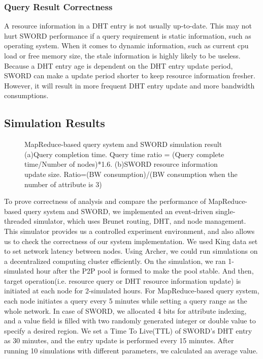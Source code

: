 \documentclass{acm_proc_article-sp}
\begin{document}
\subsubsection{Query Result Correctness}
A resource information in a DHT entry is not usually up-to-date. This may not hurt SWORD performance if a query requirement is static information, such as operating system. 
When it comes to dynamic information, such as current cpu load or free memory size, the stale information is highly likely to be useless. 
Because a DHT entry age is dependent on the DHT entry update period, SWORD can make a update period shorter to keep resource information fresher.
However, it will result in more frequent DHT entry update and more bandwidth consumptions.
\subsection{Simulation Results}
\begin{figure}[t]
\centering
{}
\caption{MapReduce-based query system and SWORD simulation result (a)Query completion time. Query time ratio = (Query complete time/Number of nodes)*1.6. 
(b)SWORD resource information update size. Ratio=(BW consumption)/(BW consumption when the number of attribute is 3)}
\end{figure}
To prove correctness of analysis and compare the performance of MapReduce-based query system and SWORD, we implemented an event-driven single-threaded simulator, which uses Brunet\cite{brunet} routing, DHT, and node management.
This simulator provides us a controlled experiment environment, and also allows us to check the correctness of our system implementation. We used King data set\cite{king} to set network latency between nodes.
Using Archer\cite{archer}, we could run simulations on a decentralized computing cluster efficiently. 
On the simulation, we ran 1-simulated hour after the P2P pool is formed to make the pool stable. And then, target operation(i.e. resource query or DHT resource information update) is initiated at each node for 2-simulated hours.
For MapReduce-based query system, each node initiates a query every 5 minutes while setting a query range as the whole network. 
In case of SWORD, we allocated 4 bits for attribute indexing, and a value field is filled with two randomly generated integer or double value to specify a desired region. 
We set a Time To Live(TTL) of SWORD's DHT entry as 30 minutes, and the entry update is performed every 15 minutes.
After running 10 simulations with different parameters, we calculated an average value.
\end{document}
